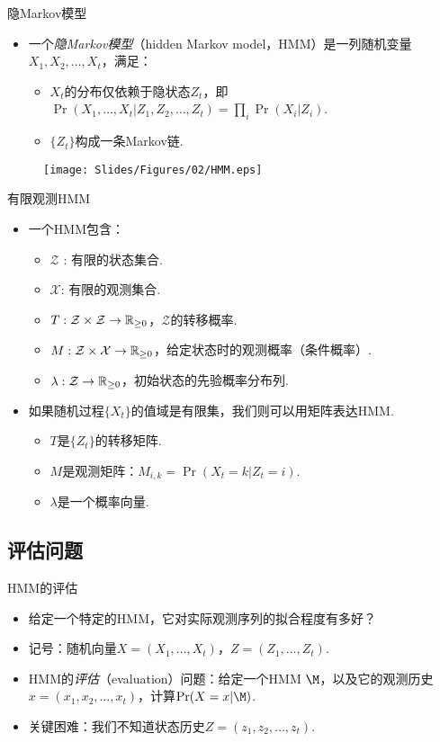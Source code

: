 \begin{frame}{隐Markov模型}
\begin{itemize}
    \item 一个\emph{隐Markov模型}（hidden Markov model，HMM）是一列随机变量$X_1,X_2,\dots, X_t$，满足：
    \begin{itemize}
        \item $X_t$的分布仅依赖于隐状态$Z_t$，即$\Pr(X_1,\dots,X_t|Z_1,Z_2,\dots,Z_t)=\prod_i \Pr(X_i|Z_i)$.
        \item $\{Z_t\}$构成一条Markov链.
    \end{itemize}
\end{itemize}
\begin{figure}
    \centering
    \texttt{[image: Slides/Figures/02/HMM.eps]}
\end{figure}
\end{frame}

\begin{frame}{有限观测HMM}
\begin{itemize}
    \item 一个HMM包含：
    \begin{itemize}
        \item $\mathcal Z$
        : 有限的状态集合.
        \item $\mathcal X$: 有限的观测集合.
        \item $T: \mathcal Z\times\mathcal Z\to \mathbb{R}_{\geq 0}$，$\mathcal Z$的转移概率.
        \item $M:\mathcal Z\times \mathcal X\to \mathbb{R}_{\geq 0}$，给定状态时的观测概率（条件概率）.
        \item $\lambda:\mathcal Z\to\mathbb{R}_{\geq 0}$，初始状态的先验概率分布列.
    \end{itemize}
    \item 如果随机过程$\{X_t\}$的值域是有限集，我们则可以用矩阵表达HMM.
    \begin{itemize}
    \item $T$是$\{Z_t\}$的转移矩阵.
    \item $M$是观测矩阵：$M_{i,k} = \Pr(X_t=k|Z_t=i)$.
    \item $\lambda$是一个概率向量.
    \end{itemize}
\end{itemize}
\end{frame}

\subsection{评估问题}
\begin{frame}{HMM的评估}
\begin{itemize}
   \item 给定一个特定的HMM，它对实际观测序列的拟合程度有多好？
   \item 记号：随机向量$X=(X_1,\dots,X_t)$，$Z=(Z_1,\dots,Z_t)$.
   \item  HMM的\emph{评估}（evaluation）问题：给定一个HMM $\M$，以及它的观测历史$x=(x_1,x_2,\dots,x_t)$，计算$\Pr(X=x|\M)$.
   \item 关键困难：我们不知道状态历史$Z=(z_1,z_2,\dots,z_t)$.
\end{itemize}
\end{frame}

